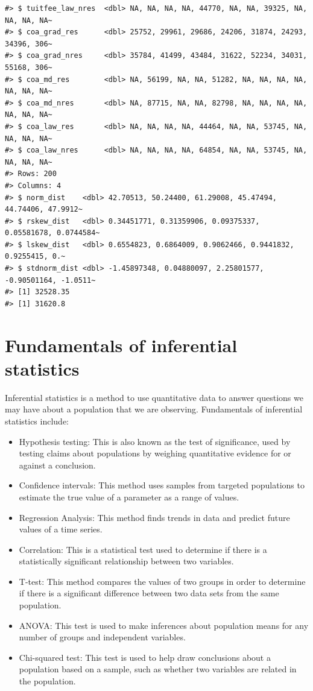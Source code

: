 \documentclass[
  letterpaper,
  DIV=11,
  numbers=noendperiod]{scrartcl}
\begin{document}
\begin{verbatim}
#> $ tuitfee_law_nres  <dbl> NA, NA, NA, NA, 44770, NA, NA, 39325, NA, NA, NA, NA~
#> $ coa_grad_res      <dbl> 25752, 29961, 29686, 24206, 31874, 24293, 34396, 306~
#> $ coa_grad_nres     <dbl> 35784, 41499, 43484, 31622, 52234, 34031, 55168, 306~
#> $ coa_md_res        <dbl> NA, 56199, NA, NA, 51282, NA, NA, NA, NA, NA, NA, NA~
#> $ coa_md_nres       <dbl> NA, 87715, NA, NA, 82798, NA, NA, NA, NA, NA, NA, NA~
#> $ coa_law_res       <dbl> NA, NA, NA, NA, 44464, NA, NA, 53745, NA, NA, NA, NA~
#> $ coa_law_nres      <dbl> NA, NA, NA, NA, 64854, NA, NA, 53745, NA, NA, NA, NA~
#> Rows: 200
#> Columns: 4
#> $ norm_dist    <dbl> 42.70513, 50.24400, 61.29008, 45.47494, 44.74406, 47.9912~
#> $ rskew_dist   <dbl> 0.34451771, 0.31359906, 0.09375337, 0.05581678, 0.0744584~
#> $ lskew_dist   <dbl> 0.6554823, 0.6864009, 0.9062466, 0.9441832, 0.9255415, 0.~
#> $ stdnorm_dist <dbl> -1.45897348, 0.04880097, 2.25801577, -0.90501164, -1.0511~
#> [1] 32528.35
#> [1] 31620.8
\end{verbatim}

\section{Fundamentals of inferential
statistics}\label{fundamentals-of-inferential-statistics}

Inferential statistics is a method to use quantitative data to answer
questions we may have about a population that we are observing.
Fundamentals of inferential statistics include:

\begin{itemize}
\item
  Hypothesis testing: This is also known as the test of significance,
  used by testing claims about populations by weighing quantitative
  evidence for or against a conclusion.
\item
  Confidence intervals: This method uses samples from targeted
  populations to estimate the true value of a parameter as a range of
  values.
\item
  Regression Analysis: This method finds trends in data and predict
  future values of a time series.
\item
  Correlation: This is a statistical test used to determine if there is
  a statistically significant relationship between two variables.
\item
  T-test: This method compares the values of two groups in order to
  determine if there is a significant difference between two data sets
  from the same population.
\item
  ANOVA: This test is used to make inferences about population means for
  any number of groups and independent variables.
\item
  Chi-squared test: This test is used to help draw conclusions about a
  population based on a sample, such as whether two variables are
  related in the population.
\end{itemize}
\end{document}

